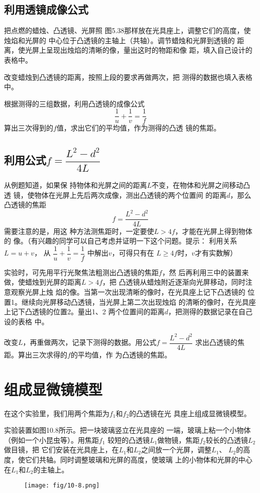 \subsection{利用透镜成像公式}

把点燃的蜡烛、凸透镜、光屏照
图5.38那样放在光具座上，调整它们的高度，使烛焰和光屏的
中心位于凸透镜的主轴上（共轴）。调节蜡烛和光屏到透镜的
距离，使光屏上呈现出烛焰的清晰的像，量出这时的物距和像
距，填入自己设计的表格中。

改变蜡烛到凸透镜的距离，按照上段的要求再做两次，把
测得的数据也填入表格中。

根据测得的三组数据，利用凸透镜的成像公式
\[\frac{1}{u}+\frac{1}{v}=\frac{1}{f} \]
算出三次得到的$f$值，求出它们的平均值，作为测得的凸透
镜的焦距。

\subsection{利用公式$f=\dfrac{L^2-d^2}{4L}$}

从例题知道，如果保
持物体和光屏之间的距离$L$不变，在物体和光屏之间移动凸透
镜，使物体在光屏上先后两次成像，测出凸透镜的两个位置间
的距离$d$，那么凸透镜的焦距
\[f=\dfrac{L^2-d^2}{4L} \]
需要注意的是，用这
种方法测焦距时，一定要使$L>4f$，才能在光屏上得到物体的
像。（有兴趣的同学可以自己考虑并证明一下这个问题。提示：
利用关系$L=u+v$，
从
$\dfrac{1}{u}+\dfrac{1}{v}=\dfrac{1}{f} $
中解出$v$，可得只有在
$L\ge 4f$时，$v$才有实数解）

实验时，可先用平行光聚焦法粗测出凸透镜的焦距$f$，然
后再利用三中的装置来做，使蜡烛到光屏的距离$L>4f$，把
凸透镜从蜡烛附近逐渐向光屏移动，同时注意观察光屏上烛
焰的像。当第一次出现清晰的像时，在光具座上记下凸透镜的
位置1。继续向光屏移动凸透镜，当光屏上第二次出现烛焰
的清晰的像时，在光具座上记下凸透镜的位置2。量出1、2
两个位置间的距离$d$，把测得的数据记录在自己设的表格
中。

改变$L$，再重做两次，记录下测得的数据。用公式$f=\dfrac{L^2-d^2}{4L}$
求出凸透镜的焦距。算出三次求得的$f$的平均值，作
为凸透镜的焦距。

\section{组成显微镜模型}
在这个实验里，我们用两个焦距为$f_1$和$f_2$的凸透镜在光
具座上组成显微镜模型。

实验装置如图10.8所示。把一块玻璃竖立在光具座的
一端，玻璃上粘一个小物体（例如一个小昆虫等）。用焦距$f_1$
较短的凸透镜$L_1$做物镜，焦距$f_2$较长的凸透镜$L_2$做目镜，把
它们安装在光具座上，在$L_1$和$L_2$之间放一个光屏，调整$L_1$、
$L_2$的高度，使它们共轴。同时调整玻璃和光屏的高度，使玻璃
上的小物体和光屏的中心在$L_1$和$L_2$的主轴上。
\begin{figure}[htp]\centering
    \texttt{[image: fig/10-8.png]}
    \caption{}
    \end{figure}

